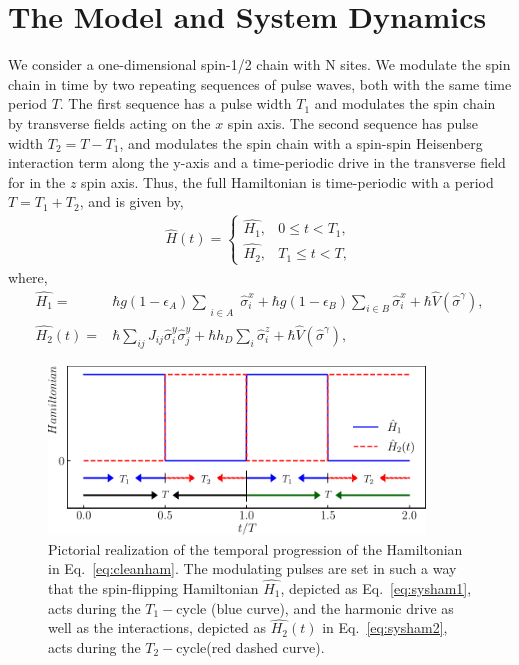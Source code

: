 \documentclass[12pt]{iopart}
\begin{document}
\section{\label{sec:mdl_n_dynam} The Model and System Dynamics}
We consider a one-dimensional spin-1/2 chain with N sites.  We modulate the spin chain in time by two repeating sequences of pulse waves, both with the same time period $T$.  The first sequence has a pulse width $T_1$ and modulates the spin chain by transverse fields acting on the $x$ spin axis. The second sequence has pulse width $T_2=T-T_1$, and modulates the spin chain with a spin-spin Heisenberg interaction term along the y-axis and a time-periodic drive in the transverse field for in the $z$ spin axis. Thus, the full Hamiltonian is time-periodic with a period $T=T_1+T_2$, and is given by,
\begin{align}
    \hat{H}(t) = 
    \begin{cases}
        \hat{H_1} , & 0\leq t < T_1,\\
        \hat{H_2} , & T_1\leq t < T,
    \end{cases}
    \label{eq:cleanham}
\end{align}
where,
\begin{align}
    \hat{H_1} = & \hbar g (1-\epsilon_A) \sum_{\substack{\\i \in A}}\hat{\sigma}^x_i + \hbar g (1-\epsilon_B) \sum_{i \in B}\hat{\sigma}^x_i+ \hbar\hat{V}(\hat{\sigma}^{\gamma}),\label{eq:sysham1}\\
    \hat{H_2}(t) = & \hbar\sum_{ij} J_{ij} \hat{\sigma}^y_i \hat{\sigma}^y_{j} +  \hbar h_D \sum_i \hat{\sigma}^z_i + \hbar\hat{V}(\hat{\sigma}^{\gamma}),
    \label{eq:sysham2}
\end{align}
\begin{figure}
    \begin{center}
        \includegraphics[width=10cm]{figure1.pdf}
    \end{center}
    \caption{Pictorial realization of the temporal progression of the Hamiltonian in Eq.~\eqref{eq:cleanham}. The modulating pulses are set in such a way that the spin-flipping Hamiltonian $\hat{H_1}$, depicted as Eq.~\eqref{eq:sysham1}, acts during the $T_1-$cycle (blue curve), and the harmonic drive as well as the interactions, depicted as $\hat{H_2}(t)$ in Eq.~\eqref{eq:sysham2}, acts during the $T_2-$cycle(red dashed curve).}
    \label{Fig:time_distribution}
\end{figure}	
\end{document}
